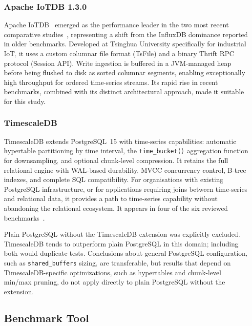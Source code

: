\subsubsection{Apache IoTDB 1.3.0}

Apache IoTDB~\cite{wang2023iotdb} emerged as the performance leader in
the two most recent comparative studies~\citep{pereira2023mulletbench,wang2023iotdb},
representing a shift from the InfluxDB dominance reported in older benchmarks.
Developed at Tsinghua University specifically for industrial IoT, it uses a custom columnar
file format (TsFile) and a binary Thrift RPC protocol (Session API). Write ingestion
is buffered in a JVM-managed heap before being flushed to disk as sorted columnar segments,
enabling exceptionally high throughput for ordered time-series streams. Its rapid rise in
recent benchmarks, combined with its distinct architectural approach, made it suitable for this study.

\subsubsection{TimescaleDB}

TimescaleDB extends PostgreSQL~15 with time-series capabilities: automatic
hypertable partitioning by time interval, the \texttt{time\_bucket()} aggregation function
for downsampling, and optional chunk-level compression. It retains the full relational engine
with WAL-based durability, MVCC concurrency control, B-tree indexes, and complete SQL
compatibility. For organisations with existing PostgreSQL infrastructure, or for applications
requiring joins between time-series and relational data, it provides a path to time-series
capability without abandoning the relational ecosystem. It appears in four of the six
reviewed benchmarks~\citep{shah2022performance,lima2024avaliando,wang2023iotdb,grzesik2020comparative}.

Plain PostgreSQL without the TimescaleDB extension was explicitly excluded. TimescaleDB
tends to outperform plain PostgreSQL in this domain; including both would duplicate tests.
Conclusions about general PostgreSQL configuration, such as \texttt{shared\_buffers}
sizing, are transferable, but results that depend on TimescaleDB-specific optimizations,
such as hypertables and chunk-level min/max pruning, do not apply directly to plain
PostgreSQL without the extension.

\subsection{Benchmark Tool}
\label{sec:benchmark-tool}

